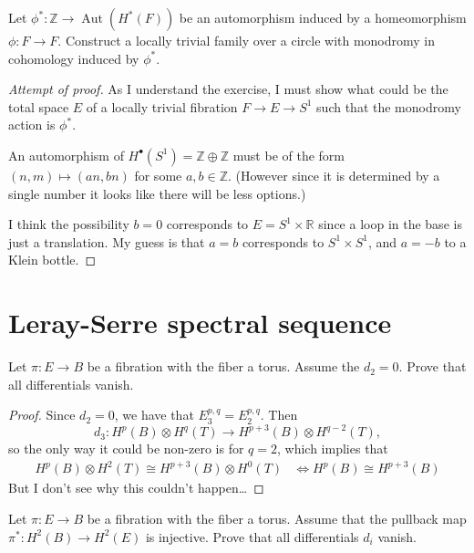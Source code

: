 \begin{manualexercise}{2.1}
	Let $ \phi^* :\mathbb{Z}\to \operatorname{Aut}(H^*(F))$ be an automorphism induced by a homeomorphism $\phi:F\to F$. Construct a locally trivial family over a circle with monodromy in cohomology induced by $\phi^*$. 
\end{manualexercise}

\begin{proof}[Attempt of proof]
As I understand the exercise, I must show what could be the total space $E$ of a locally trivial fibration $F\to E\to S^1$ such that the monodromy action is $\phi^*$.

	An automorphism of $H^{\bullet}(S^1)=\mathbb{Z}\oplus \mathbb{Z}$ must be of the form $(n,m)\mapsto (an,bn)$ for some $a,b\in\mathbb{Z}$. (However since it is determined by a single number it looks like there will be less options.)

	I think the possibility $b=0$ corresponds to $E=S^1\times \mathbb{R}$ since a loop in the base is just a translation. My guess is that $a=b$ corresponds to  $S^1\times S^1$, and $a=-b$ to a Klein bottle.
\end{proof}

\section{Leray-Serre spectral sequence}

\begin{manualexercise}{2.4}
	Let $\pi:E\longrightarrow B$ be a fibration with the fiber a torus. Assume the $d_2=0$. Prove that all differentials vanish.
\end{manualexercise}

\begin{proof}
	Since $d_2=0$, we have that $E_3^{p,q}=E_2^{p,q}$. Then 
	\[d_3:H^{p}(B)\otimes H^{q}(T)\longrightarrow H^{p+3}(B)\otimes H^{q-2}(T),\] so the only way it could be non-zero is for $q=2$, which implies that 
	\begin{align*}
		H^p(B)\otimes H^{2}(T)\cong H^{p+3}(B)\otimes H^{0}(T)&\iff H^{p}(B)\cong H^{p+3}(B)
	\end{align*}
But I don't see why this couldn't happen…
\end{proof}

\begin{manualexercise}{2.5}
	Let $\pi:E\to B$ be a fibration with the fiber a torus. Assume that the pullback map $\pi^* :H^2(B)\to H^{2}(E)$ is injective. Prove that all differentials $d_i$ vanish.
\end{manualexercise}


